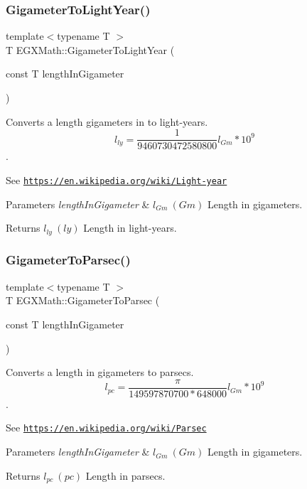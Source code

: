 \subsubsection{\texorpdfstring{Gigameter\+To\+Light\+Year()}{GigameterToLightYear()}}
{\footnotesize\ttfamily template$<$typename T $>$ \\
T E\+G\+X\+Math\+::\+Gigameter\+To\+Light\+Year (\begin{DoxyParamCaption}\item[{const T}]{length\+In\+Gigameter }\end{DoxyParamCaption})}



Converts a length gigameters in to light-\/years. \[ l_{ly}= \frac{1}{9460730472580800} l_{Gm} * 10^{9} \]. 

See \href{https://en.wikipedia.org/wiki/Light-year}{\tt https\+://en.\+wikipedia.\+org/wiki/\+Light-\/year} 
\begin{DoxyParams}{Parameters}
{\em length\+In\+Gigameter} & $ l_{Gm}\ (Gm)$ Length in gigameters. \\
\hline
\end{DoxyParams}
\begin{DoxyReturn}{Returns}
$ l_{ly}\ (ly)$ Length in light-\/years. 
\end{DoxyReturn}
\mbox{\label{group___e_g_x_math-_conversions-_length_conversions-_s_i-_gigameter-_astronomical_ga5a83442adf1a2b81447b7355527f5ec4}} 
\subsubsection{\texorpdfstring{Gigameter\+To\+Parsec()}{GigameterToParsec()}}
{\footnotesize\ttfamily template$<$typename T $>$ \\
T E\+G\+X\+Math\+::\+Gigameter\+To\+Parsec (\begin{DoxyParamCaption}\item[{const T}]{length\+In\+Gigameter }\end{DoxyParamCaption})}



Converts a length in gigameters to parsecs. \[ l_{pc}=\frac{\pi}{149597870700 * 648000} l_{Gm} * 10^{9} \]. 

See \href{https://en.wikipedia.org/wiki/Parsec}{\tt https\+://en.\+wikipedia.\+org/wiki/\+Parsec} 
\begin{DoxyParams}{Parameters}
{\em length\+In\+Gigameter} & $ l_{Gm}\ (Gm)$ Length in gigameters. \\
\hline
\end{DoxyParams}
\begin{DoxyReturn}{Returns}
$ l_{pc}\ (pc)$ Length in parsecs. 
\end{DoxyReturn}
